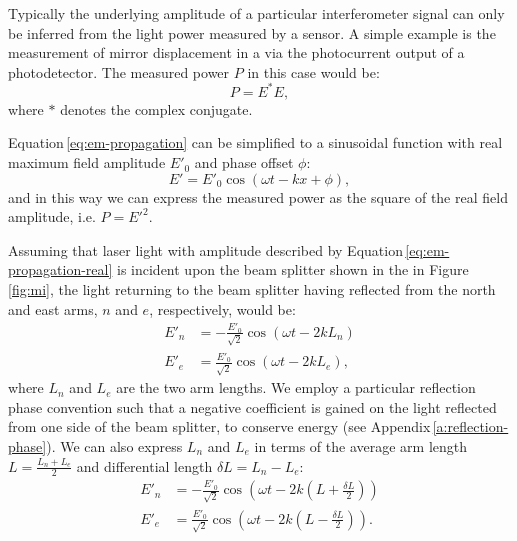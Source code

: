 Typically the underlying amplitude of a particular interferometer signal can only be inferred from the light power measured by a sensor. A simple example is the measurement of mirror displacement in a \MI{} via the photocurrent output of a photodetector. The measured power $P$ in this case would be:
\begin{equation}
  P = E^{\ast} E,
\end{equation}
where $\ast$ denotes the complex conjugate.

Equation\,\ref{eq:em-propagation} can be simplified to a sinusoidal function with real maximum field amplitude $E'_0$ and phase offset $\phi$:
\begin{equation}
  \label{eq:em-propagation-real}
  E' = E'_0 \cos \left( \omega t - kx + \phi \right),
\end{equation}
and in this way we can express the measured power as the square of the real field amplitude, i.e. $P = E'^2$.

Assuming that laser light with amplitude described by Equation\,\ref{eq:em-propagation-real} is incident upon the beam splitter shown in the \MI{} in Figure\,\ref{fig:mi}, the light returning to the beam splitter having reflected from the north and east arms, $n$ and $e$, respectively, would be:
\begin{align}
  E'_n &= -\frac{E'_0}{\sqrt{2}} \cos \left( \omega t - 2kL_n \right) \\
  E'_e &= \frac{E'_0}{\sqrt{2}} \cos \left( \omega t - 2kL_e \right),
\end{align}
where $L_n$ and $L_e$ are the two arm lengths. We employ a particular reflection phase convention such that a negative coefficient is gained on the light reflected from one side of the beam splitter, to conserve energy (see Appendix\,\ref{a:reflection-phase}). We can also express $L_n$ and $L_e$ in terms of the average arm length $L = \frac{L_n + L_e}{2}$ and differential length $\delta L = L_n - L_e$:
\begin{align}
  E'_n &= -\frac{E'_0}{\sqrt{2}} \cos \left( \omega t - 2k \left( L + \frac{\delta L}{2} \right) \right) \\
  E'_e &= \frac{E'_0}{\sqrt{2}} \cos \left( \omega t - 2k \left( L - \frac{\delta L}{2} \right) \right).
\end{align}

